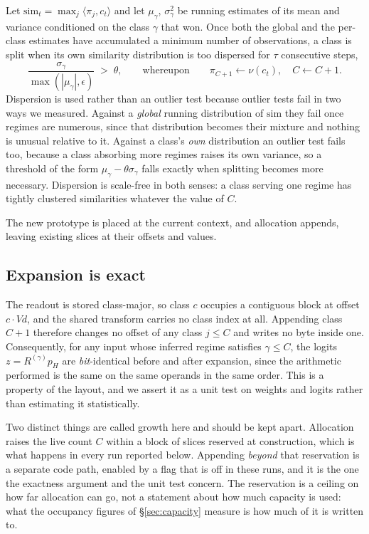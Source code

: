 \documentclass[11pt,a4paper]{article}
\begin{document}
Let $\mathrm{sim}_t = \max_j\langle\pi_j,c_t\rangle$ and let $\mu_\gamma$,
$\sigma^2_\gamma$ be running estimates of its mean and variance conditioned on
the class $\gamma$ that won. Once both the global and the per-class estimates
have accumulated a minimum number of observations, a class is split when its
own similarity distribution is too dispersed for $\tau$ consecutive steps,
\begin{equation}
  \frac{\sigma_\gamma}{\max(|\mu_\gamma|,\epsilon)} \;>\; \theta,
  \qquad\text{whereupon}\qquad
  \pi_{C+1} \leftarrow \nu(c_t), \quad C \leftarrow C+1 .
  \label{eq:grow}
\end{equation}
Dispersion is used rather than an outlier test because outlier tests fail in
two ways we measured. Against a \emph{global} running distribution of
$\mathrm{sim}$ they fail once regimes are numerous, since that distribution
becomes their mixture and nothing is unusual relative to it. Against a class's
\emph{own} distribution an outlier test fails too, because a class absorbing
more regimes
raises its own variance, so a threshold of the form $\mu_\gamma - \theta
\sigma_\gamma$ falls exactly when splitting becomes more necessary. Dispersion
is scale-free in both senses: a class serving one regime has tightly clustered
similarities whatever the value of $C$.

The new prototype is placed at the current context, and allocation appends,
leaving existing slices at their offsets and values.

\subsection{Expansion is exact}
\label{sec:exact}

The readout is stored class-major, so class $c$ occupies a contiguous block at
offset $c\cdot Vd$, and the shared transform carries no class index at all.
Appending class $C+1$ therefore changes no offset of any class $j\le C$ and
writes no byte inside one. Consequently, for any input whose inferred regime satisfies $\gamma\le C$,
the logits $z=R^{(\gamma)}p_H$ are \emph{bit}-identical before and after
expansion, since the arithmetic performed is the same on the same operands in
the same order. This is a property of the layout, and we assert it as a unit
test on weights and logits rather than estimating it statistically.

Two distinct things are called growth here and should be kept apart. Allocation
raises the live count $C$ within a block of slices reserved at construction,
which is what happens in every run reported below. Appending \emph{beyond} that
reservation is a separate code path, enabled by a flag that is off in these
runs, and it is the one the exactness argument and the unit test concern. The
reservation is a ceiling on how far allocation can go, not a statement about
how much capacity is used: what the occupancy figures of \S\ref{sec:capacity}
measure is how much of it is written to.
\end{document}
